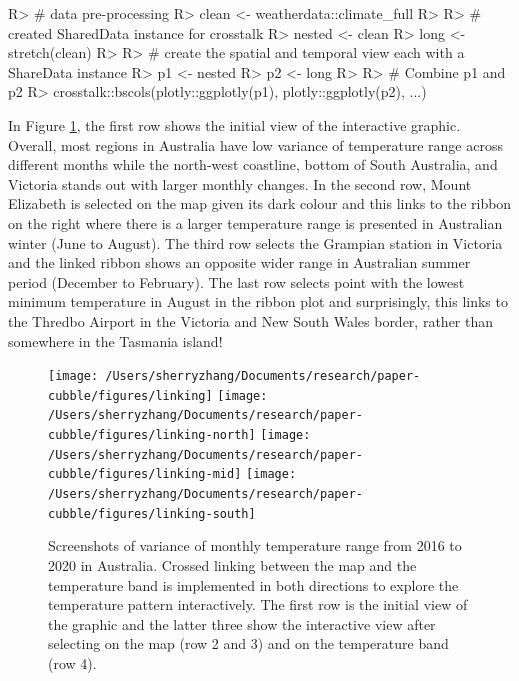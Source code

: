 \documentclass[
]{jss}
\begin{document}
\begin{CodeChunk}
\begin{CodeInput}
R> # data pre-processing
R> clean <- weatherdata::climate_full %
R> 
R> # created SharedData instance for crosstalk
R> nested <- clean %
R> long <- stretch(clean) %
R> 
R> # create the spatial and temporal view each with a ShareData instance
R> p1 <- nested %
R> p2 <- long %
R> 
R> # Combine p1 and p2
R> crosstalk::bscols(plotly::ggplotly(p1), plotly::ggplotly(p2), ...)
\end{CodeInput}
\end{CodeChunk}

In Figure \ref{fig:interactive-linking}, the first row shows the initial
view of the interactive graphic. Overall, most regions in Australia have
low variance of temperature range across different months while the
north-west coastline, bottom of South Australia, and Victoria stands out
with larger monthly changes. In the second row, Mount Elizabeth is
selected on the map given its dark colour and this links to the ribbon
on the right where there is a larger temperature range is presented in
Australian winter (June to August). The third row selects the Grampian
station in Victoria and the linked ribbon shows an opposite wider range
in Australian summer period (December to February). The last row selects
point with the lowest minimum temperature in August in the ribbon plot
and surprisingly, this links to the Thredbo Airport in the Victoria and
New South Wales border, rather than somewhere in the Tasmania island!

\begin{CodeChunk}
\begin{figure}

{\centering \texttt{[image: /Users/sherryzhang/Documents/research/paper-cubble/figures/linking]} \texttt{[image: /Users/sherryzhang/Documents/research/paper-cubble/figures/linking-north]} \texttt{[image: /Users/sherryzhang/Documents/research/paper-cubble/figures/linking-mid]} \texttt{[image: /Users/sherryzhang/Documents/research/paper-cubble/figures/linking-south]} 

}

\caption[Screenshots of variance of monthly temperature range from 2016 to 2020 in Australia]{Screenshots of variance of monthly temperature range from 2016 to 2020 in Australia. Crossed linking between the map and the temperature band is implemented in both directions to explore the temperature pattern interactively. The first row is the initial view of the graphic and the latter three show the interactive view after selecting on the map (row 2 and 3) and on the temperature band (row 4).}\label{fig:interactive-linking}
\end{figure}
\end{CodeChunk}
\end{document}
